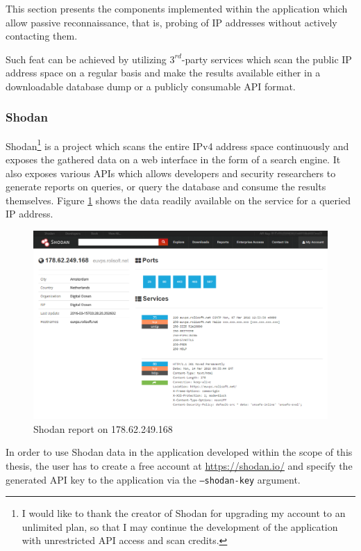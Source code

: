 \documentclass[a4paper,12pt]{article}
\begin{document}
	This section presents the components implemented within the application which allow passive reconnaissance, that is, probing of IP addresses without actively contacting them.
	
	Such feat can be achieved by utilizing $3^{rd}$-party services which scan the public IP address space on a regular basis and make the results available either in a downloadable database dump or a publicly consumable API format.

\subsubsection{Shodan} \label{shodan}
 

	Shodan\footnote{I would like to thank the creator of Shodan for upgrading my account to an unlimited plan, so that I may continue the development of the application with unrestricted API access and scan credits.}\cite{shodan16} is a project which scans the entire IPv4 address space continuously and exposes the gathered data on a web interface in the form of a search engine. It also exposes various APIs which allows developers and security researchers to generate reports on queries, or query the database and consume the results themselves. Figure \ref{shodanscr} shows the data readily available on the service for a queried IP address.

	\begin{figure}[!htbp]
		\centering
		\includegraphics[scale=0.355]{shodan.png}
		\caption{Shodan report on 178.62.249.168}
		\label{shodanscr}
	\end{figure}
	
	In order to use Shodan data in the application developed within the scope of this thesis, the user has to create a free account at \url{https://shodan.io/} and specify the generated API key to the application via the \texttt{--shodan-key} argument.
	
\end{document}
